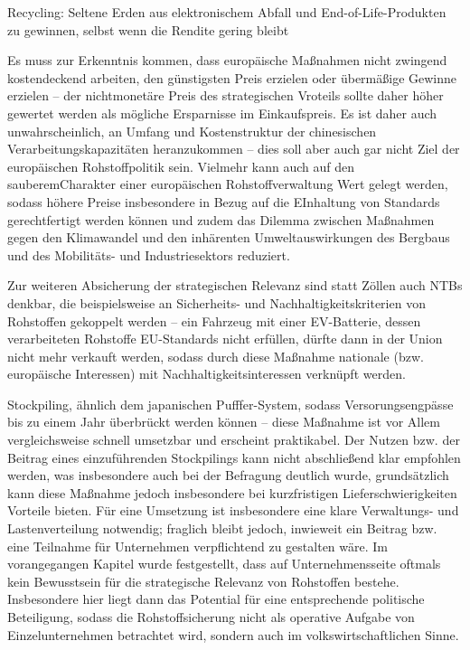 \documentclass[12pt,a4paper,oneside]{book} %
\begin{document}
Recycling: Seltene Erden aus elektronischem Abfall und End-of-Life-Produkten zu gewinnen, selbst wenn die Rendite gering bleibt

Es muss zur Erkenntnis kommen, dass europäische Maßnahmen nicht zwingend kostendeckend arbeiten, den günstigsten Preis erzielen oder übermäßige Gewinne erzielen -- der nichtmonetäre Preis des strategischen Vroteils sollte daher höher gewertet werden als mögliche Ersparnisse im Einkaufspreis. Es ist daher auch unwahrscheinlich, an Umfang und Kostenstruktur der chinesischen Verarbeitungskapazitäten heranzukommen -- dies soll aber auch gar nicht Ziel der europäischen Rohstoffpolitik sein.
Vielmehr kann auch auf den \glqq sauberem\grqq Charakter einer europäischen Rohstoffverwaltung Wert gelegt werden, sodass höhere Preise insbesondere in Bezug auf die EInhaltung von Standards gerechtfertigt werden können und zudem das Dilemma zwischen Maßnahmen gegen den Klimawandel und den inhärenten Umweltauswirkungen des Bergbaus und des Mobilitäts- und Industriesektors reduziert.

Zur weiteren Absicherung der strategischen Relevanz sind statt Zöllen auch NTBs denkbar, die beispielsweise an Sicherheits- und Nachhaltigkeitskriterien von Rohstoffen gekoppelt werden -- ein Fahrzeug mit einer EV-Batterie, dessen verarbeiteten Rohstoffe EU-Standards nicht erfüllen, dürfte dann in der Union nicht mehr verkauft werden, sodass durch diese Maßnahme nationale (bzw. europäische Interessen) mit Nachhaltigkeitsinteressen verknüpft werden.

Stockpiling, ähnlich dem japanischen Pufffer-System, sodass Versorungsengpässe bis zu einem Jahr überbrückt werden können -- diese Maßnahme ist vor Allem vergleichsweise schnell umsetzbar und erscheint praktikabel. Der Nutzen bzw. der Beitrag eines einzuführenden Stockpilings kann nicht abschließend klar empfohlen werden, was insbesondere auch bei der Befragung deutlich wurde, grundsätzlich kann diese Maßnahme jedoch insbesondere bei kurzfristigen Lieferschwierigkeiten Vorteile bieten. Für eine Umsetzung ist insbesondere eine klare Verwaltungs- und Lastenverteilung notwendig; fraglich bleibt jedoch, inwieweit ein Beitrag bzw. eine Teilnahme für Unternehmen verpflichtend zu gestalten wäre.
Im vorangegangen Kapitel wurde festgestellt, dass auf Unternehmensseite oftmals kein Bewusstsein für die strategische Relevanz von Rohstoffen bestehe. Insbesondere hier liegt dann das Potential für eine entsprechende politische Beteiligung, sodass die Rohstoffsicherung nicht als operative Aufgabe von Einzelunternehmen betrachtet wird, sondern auch im volkswirtschaftlichen Sinne.
\end{document}
